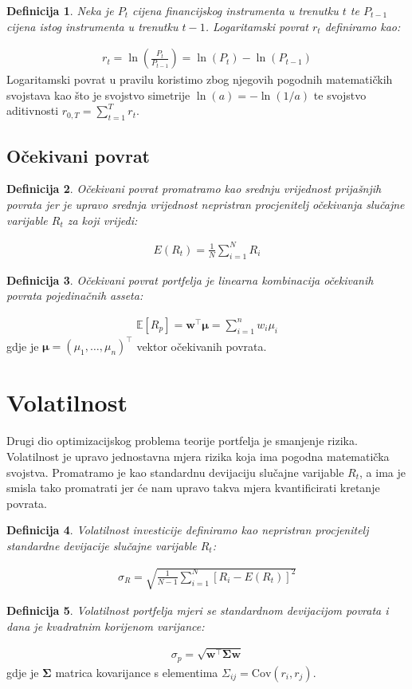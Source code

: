 \documentclass[zavrsnirad]{fer}
\newtheorem{definition}{Definicija}
\begin{document}
\begin{definition}
    Neka je $P_t$ cijena financijskog instrumenta u trenutku $t$ te
    $P_{t-1}$ cijena istog instrumenta u trenutku $t-1$. Logaritamski povrat
    $r_t$ definiramo kao:
\end{definition}
\begin{align*}
    r_t = \ln\left(\frac{P_t}{P_{t-1}}\right) = \ln(P_t) - \ln(P_{t-1})
\end{align*}
\noindent Logaritamski povrat u pravilu koristimo zbog njegovih pogodnih
matematičkih svojstava kao što je svojstvo simetrije $\ln(a) = -\ln(1/a)$
te svojstvo aditivnosti $r_{0,T} = \sum_{t=1}^T r_t$.
\subsection{Očekivani povrat }
\label{sek:ocekivani_povrat}
\begin{definition}
	Očekivani povrat promatramo kao srednju vrijednost prijašnjih
	povrata jer je upravo srednja vrijednost nepristran procjenitelj
	očekivanja slučajne varijable $R_t$ za koji vrijedi:
\end{definition}
\begin{align*}
	E(R_t) =\frac{1}{N} \sum_{i = 1}^{N} R_i
\end{align*}
\begin{definition}
Očekivani povrat portfelja je linearna kombinacija očekivanih povrata pojedinačnih asseta:
\end{definition}
\begin{align*}
\mathbb{E}[R_p] =
    \mathbf{w}^\intercal \boldsymbol{\mu} = \sum_{i=1}^n w_i \mu_i
\end{align*}
\indent gdje je $\boldsymbol{\mu} = (\mu_1, \dots, \mu_n)^\intercal$ vektor očekivanih povrata.

\section{Volatilnost}
Drugi dio optimizacijskog problema teorije portfelja je smanjenje rizika.
Volatilnost je upravo jednostavna mjera rizika koja ima pogodna matematička svojstva.
Promatramo je kao standardnu devijaciju slučajne varijable $R_t$, a ima je smisla tako promatrati
jer će nam upravo takva mjera kvantificirati kretanje povrata.
\begin{definition}
	Volatilnost investicije definiramo kao nepristran procjenitelj
	standardne devijacije slučajne varijable $R_t$:
\end{definition}
\begin{align*}
	\sigma_R = \sqrt{\frac{1}{N - 1} \sum_{i = 1}^{N} \left[R_i - E(R_t)\right]^2}
\end{align*}
\begin{definition}
Volatilnost portfelja mjeri se standardnom devijacijom povrata i dana je kvadratnim korijenom varijance:
\end{definition}
\begin{align*}
\sigma_p = \sqrt{\mathbf{w}^\intercal \boldsymbol{\Sigma} \mathbf{w}}
\end{align*}
\indent gdje je $\boldsymbol{\Sigma}$ matrica kovarijance s elementima $\Sigma_{ij} = \text{Cov}(r_i, r_j)$.
\end{document}
